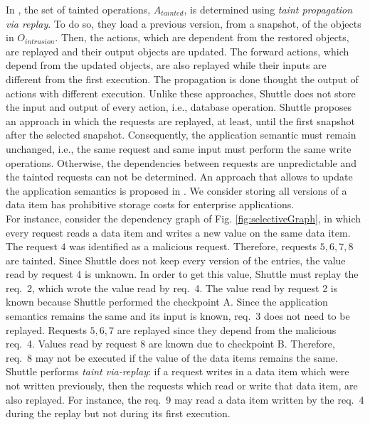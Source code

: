 In \cite{goel,retro}, the set of tainted operations, $A_{tainted}$, is determined using \textit{taint propagation via replay}. To do so, they load a previous version, from a snapshot, of the objects in $O_{intrusion}$. Then, the actions, which are dependent from the restored objects, are replayed and their output objects are updated. The forward actions, which depend from the updated objects, are also replayed while their inputs are different from the first execution. The propagation is done thought the output of actions with different execution.
Unlike these approaches, Shuttle does not store the input and output of every action, i.e., database operation. Shuttle proposes an approach in which the requests are replayed, at least, until the first snapshot after the selected snapshot. Consequently, the application semantic must remain unchanged, i.e., the same request and same input must perform the same write operations. Otherwise, the dependencies between requests are unpredictable and the tainted requests can not be determined. An approach that allows to update the application semantics is proposed in \cite{warp}. We consider storing all versions of a data item has prohibitive storage costs for enterprise applications.\\

For instance, consider the dependency graph of Fig. \ref{fig:selectiveGraph}, in which every request reads a data item and writes a new value on the same data item. The request $4$ was identified as a malicious request. Therefore, requests $5,6,7,8$ are tainted. Since Shuttle does not keep every version of the entries, the value read by request 4 is unknown. In order to get this value, Shuttle must replay the {req.~2}, which wrote the value read by {req.~4}. The value read by request 2 is known because Shuttle performed the checkpoint A. Since the application semantics remains the same and its input is known, {req.~3} does not need to be replayed. Requests $5,6,7$ are replayed since they depend from the malicious {req.~4}. Values read by request 8 are known due to checkpoint B. Therefore, {req.~8} may not be executed if the value of the data items remains the same. Shuttle performs \textit{taint via-replay}: if a request writes in a data item which were not written previously, then the requests which read or write that data item, are also replayed. For instance, the {req.~9} may read a data item written by the {req.~4} during the replay but not during its first execution.\\


